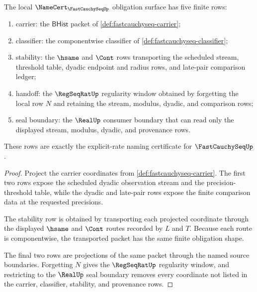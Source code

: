 \begin{theorem}
\label{thm:fastcauchyseq-namecert-obligation-surface}
The local $\NameCert_{\FastCauchySeqUp}$ obligation surface has five finite rows:
\begin{enumerate}
\item carrier: the $\mathsf{BHist}$ packet of \autoref{def:fastcauchyseq-carrier};
\item classifier: the componentwise classifier of \autoref{def:fastcauchyseq-classifier};
\item stability: the $\hsame$ and $\Cont$ rows transporting the scheduled stream, threshold table, dyadic endpoint and radius rows, and late-pair comparison ledger;
\item handoff: the $\RegSeqRatUp$ regularity window obtained by forgetting the local row $N$ and retaining the stream, modulus, dyadic, and comparison rows;
\item seal boundary: the $\RealUp$ consumer boundary that can read only the displayed stream, modulus, dyadic, and provenance rows.
\end{enumerate}
These rows are exactly the explicit-rate naming certificate for $\FastCauchySeqUp$.
\end{theorem}
\begin{proof}
Project the carrier coordinates from \autoref{def:fastcauchyseq-carrier}. The first two rows expose the scheduled dyadic observation stream and the precision-threshold table, while the dyadic and late-pair rows expose the finite comparison data at the requested precisions.

The stability row is obtained by transporting each projected coordinate through the displayed $\hsame$ and $\Cont$ routes recorded by $L$ and $T$. Because each route is componentwise, the transported packet has the same finite obligation shape.

The final two rows are projections of the same packet through the named source boundaries. Forgetting $N$ gives the $\RegSeqRatUp$ regularity window, and restricting to the $\RealUp$ seal boundary removes every coordinate not listed in the carrier, classifier, stability, and provenance rows.
\end{proof}

